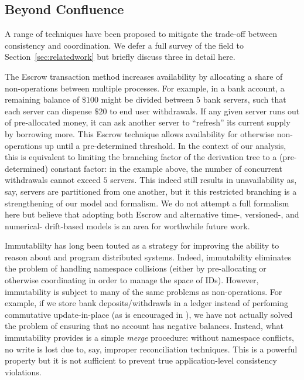 
\subsection{Beyond Confluence}

A range of techniques have been proposed to mitigate the trade-off
between consistency and coordination. We defer a full survey of the
field to Section~\ref{sec:relatedwork} but briefly discuss three in
detail here.

 The Escrow transaction method increases availability
by allocating a share of non-\iconfluent operations between multiple
processes. For example, in a bank account, a remaining balance of
$\$100$ might be divided between $5$ bank servers, such that each
server can dispense $\$20$ to end user withdrawals. If any given
server runs out of pre-allocated money, it can ask another server to
``refresh'' its current supply by borrowing more. This Escrow
technique allows availability for otherwise non-\iconfluent operations
up until a pre-determined threshold. In the context of our \cfreedom
analysis, this is equivalent to limiting the branching factor of the
derivation tree to a (pre-determined) constant factor: in the example
above, the number of concurrent withdrawals cannot exceed $5$
servers. This indeed still results in unavailability as, say, servers
are partitioned from one another, but it this restricted branching is
a strengthening of our model and formalism. We do not attempt a full
formalism here but believe that adopting both Escrow and alternative
time-, versioned-, and numerical- drift-based models is an area for
worthwhile future work.

 Immutablilty has long been touted as a
strategy for improving the ability to reason about and program
distributed systems. Indeed, immutability eliminates the problem of
handling namespace collisions (either by pre-allocating or otherwise
coordinating in order to manage the space of IDs). However,
immutability is subject to many of the same problems as
non-\iconfluent operations. For example, if we store bank
deposits/withdrawls in a ledger instead of perfoming commutative
update-in-place (as is encouraged in \lang), we have not actually
solved the problem of ensuring that no account has negative
balances. Instead, what immutability provides is a simple
\textit{merge} procedure: without namespace conflicts, no write is
lost due to, say, improper reconciliation techniques. This is a
powerful property but it is not sufficient to prevent true
application-level consistency violations.

